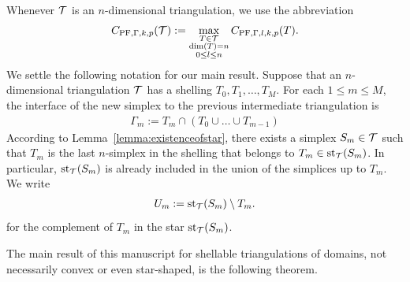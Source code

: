 \documentclass[10pt,a4paper]{article}
\begin{document}
Whenever ${\mathcal T}$ is an $n$-dimensional triangulation, we use the abbreviation
\begin{align*}
    C_{{\rm PF},\Gamma,k,p}({\mathcal T}) 
    :=
    \max\limits_{ \substack{ T \in {\mathcal T} \\ \dim(T)=n \\ 0 \leq l \leq n } }
    C_{{\rm PF},\Gamma,l,k,p}(T)
    .
\end{align*}
We settle the following notation for our main result. 
Suppose that an $n$-dimensional triangulation ${\mathcal T}$ has a shelling $T_{0}, T_{1}, \dots, T_{M}$. 
For each $1 \leq m \leq M$, the interface of the new simplex to the previous intermediate triangulation is 
\begin{align*}
    \Gamma_{m} := T_{m} \cap \left( T_{0} \cup \dots \cup T_{m-1} \right)
\end{align*}
According to Lemma~\ref{lemma:existenceofstar}, 
there exists a simplex $S_{m} \in {\mathcal T}$ 
such that $T_{m}$ is the last $n$-simplex in the shelling that belongs to $T_{m} \in \operatorname{st}_{{\mathcal T}}(S_{m})$.
In particular, $\operatorname{st}_{{\mathcal T}}(S_{m})$ is already included in the union of the simplices up to $T_m$. 
We write 
\begin{align*}
    U_{m} := \operatorname{st}_{{\mathcal T}}(S_{m}) \setminus T_{m}.
\end{align*}
for the complement of $T_{m}$ in the star $\operatorname{st}_{{\mathcal T}}(S_{m})$. 

The main result of this manuscript for shellable triangulations of domains, not necessarily convex or even star-shaped, is the following theorem. 
\end{document}
